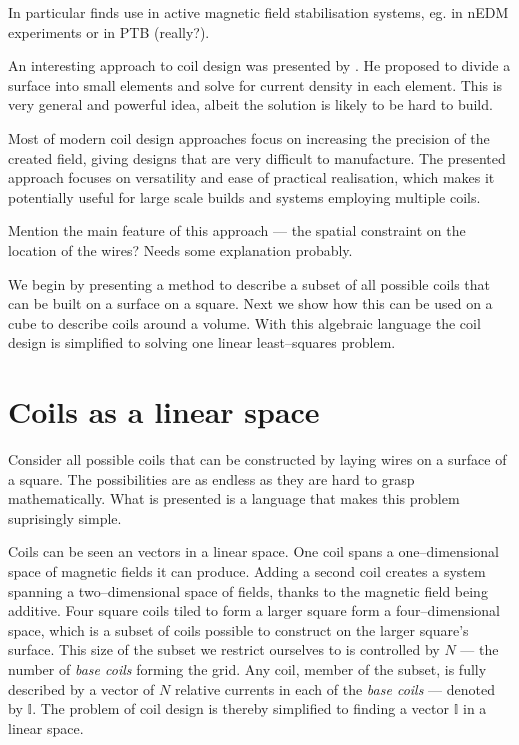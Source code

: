 In particular finds use in active magnetic field stabilisation systems, eg. in nEDM experiments or in PTB (really?).

An interesting approach to coil design was presented by \citeauthor{Compton1982} \citep{Compton1982}. He proposed to divide a surface into small elements and solve for current density in each element. This is very general and powerful idea, albeit the solution is likely to be hard to build.

Most of modern coil design approaches focus on increasing the precision of the created field, giving designs that are very difficult to manufacture. The presented approach focuses on versatility and ease of practical realisation, which makes it potentially useful for large scale builds and systems employing multiple coils.

Mention the main feature of this approach --- the spatial constraint on the location of the wires? Needs some explanation probably.

We begin by presenting a method to describe a subset of all possible coils that can be built on a surface on a square. Next we show how this can be used on a cube to describe coils around a volume. With this algebraic language the coil design is simplified to solving one linear least--squares problem.


\section{Coils as a linear space}
Consider all possible coils that can be constructed by laying wires on a surface of a square. The possibilities are as endless as they are hard to grasp mathematically. What is presented is a language that makes this problem suprisingly simple.

Coils can be seen an vectors in a linear space. One coil spans a one--dimensional space of magnetic fields it can produce. Adding a second coil creates a system spanning a two--dimensional space of fields, thanks to the magnetic field being additive. Four square coils tiled to form a larger square form a four--dimensional space, which is a subset of coils possible to construct on the larger square's surface. This size of the subset we restrict ourselves to is controlled by $N$ --- the number of \emph{base coils} forming the grid. Any coil, member of the subset, is fully described by a vector of $N$ relative currents in each of the \emph{base coils} --- denoted by $\mathbb{I}$. The problem of coil design is thereby simplified to finding a vector $\mathbb{I}$ in a linear space.

